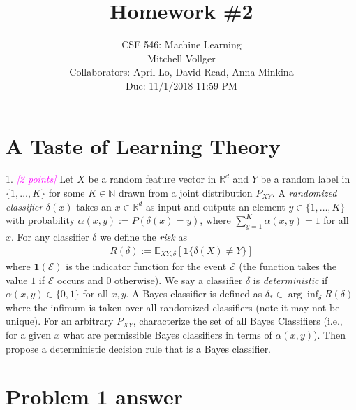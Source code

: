 \documentclass{article}
\date{{}}
\newcommand{\field}[1]{\mathbb{#1}}
\newcommand{\1}{\mathbf{1}}
\newcommand{\E}{\mathbb{E}} %
\newcommand{\R}{\field{R}} %
\newcommand{\grade}[1]{\small\textcolor{magenta}{\emph{[#1 points]}} \normalsize}
\begin{document}
\title{Homework \#2}
\author{\normalsize{CSE 546: Machine Learning}\\
\normalsize{Mitchell Vollger} \\
\normalsize{Collaborators: April Lo, David Read, Anna Minkina} \\
\normalsize{Due: 11/1/2018  11:59 PM}}
\maketitle

\section{A Taste of Learning Theory}
1. \grade{2}
Let $X$ be a random feature vector in $\R^d$ and $Y$ be a random label in $\{1,\dots,K\}$ for some $K \in \mathbb{N}$ drawn from a joint distribution $P_{XY}$. 
A \emph{randomized classifier} $\delta(x)$ takes an $x\in \R^d$ as input and outputs an element $y \in \{1,\dots,K\}$ with probability $\alpha(x,y) := P(\delta(x) = y)$, where $\sum_{y=1}^K \alpha(x,y) = 1$ for all $x$.
For any classifier $\delta$ we define the \emph{risk} as
\begin{align*}
R(\delta) := \E_{XY,\delta}[ \1\{ \delta(X) \neq Y \}]
\end{align*}
where $\1(\mathcal{E})$ is the indicator function for the event $\mathcal{E}$ (the
function takes the value $1$ if $\mathcal{E}$ occurs and $0$ otherwise).
We say a classifier $\delta$ is \emph{deterministic} if $\alpha(x,y) \in \{0,1\}$ for all $x,y$.
A Bayes classifier is defined as $\delta_* \in \arg\inf_\delta R(\delta)$ where the infimum is taken over all randomized classifiers (note it may not be unique). 
For an arbitrary $P_{XY}$, characterize the set of all Bayes Classifiers (i.e., for a given $x$ what are permissible Bayes classifiers in terms of $\alpha(x,y)$).
Then propose a deterministic decision rule that is a Bayes classifier.\\



\section*{Problem 1 answer }
\end{document}
